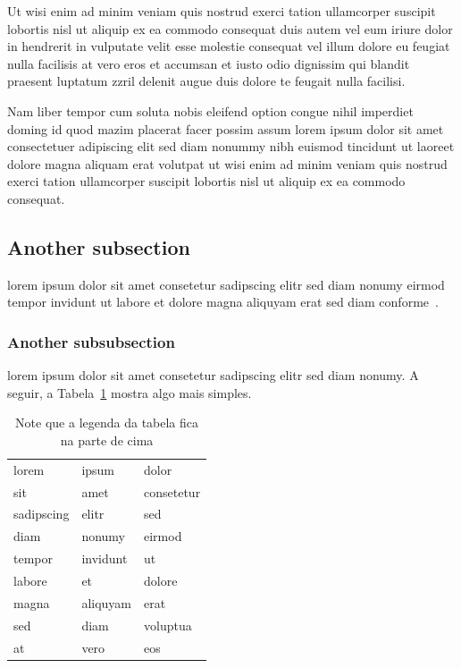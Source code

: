 Ut wisi enim ad minim veniam quis nostrud exerci tation
ullamcorper suscipit lobortis nisl ut aliquip ex ea commodo
consequat duis autem vel eum iriure dolor in hendrerit in
vulputate velit esse molestie consequat vel illum dolore eu
feugiat nulla facilisis at vero eros et accumsan et iusto odio
dignissim qui blandit praesent luptatum zzril delenit augue duis
dolore te feugait nulla facilisi.

Nam liber tempor cum soluta nobis eleifend option congue nihil
imperdiet doming id quod mazim placerat facer possim assum lorem
ipsum dolor sit amet consectetuer adipiscing elit sed diam nonummy
nibh euismod tincidunt ut laoreet dolore magna aliquam erat
volutpat ut wisi enim ad minim veniam quis nostrud exerci tation
ullamcorper suscipit lobortis nisl ut aliquip ex ea commodo
consequat.

\subsection{Another subsection}

lorem ipsum dolor sit amet consetetur sadipscing elitr sed diam
nonumy eirmod tempor invidunt ut labore et dolore magna aliquyam
erat sed diam conforme~.

\subsubsection{Another subsubsection}

lorem ipsum dolor sit amet consetetur sadipscing elitr sed diam
nonumy. A seguir, a Tabela~\ref{tab:tab2} mostra algo mais
simples.

\begin{table}
\begin{center}%
\caption{\label{tab:tab2}Note que a legenda da tabela fica na parte de cima}%
\begin{tabular*}{.7\linewidth}{@{\extracolsep{\fill}}lll}%
\noalign{\smallskip}
\hline
lorem & ipsum & dolor \tabularnewline
sit & amet & consetetur \tabularnewline
sadipscing & elitr & sed \tabularnewline
diam & nonumy & eirmod \tabularnewline
tempor & invidunt & ut \tabularnewline
labore & et & dolore \tabularnewline
magna & aliquyam & erat \tabularnewline
sed & diam & voluptua \tabularnewline
at & vero & eos \tabularnewline
\end{tabular*}
\end{center}
\end{table}

